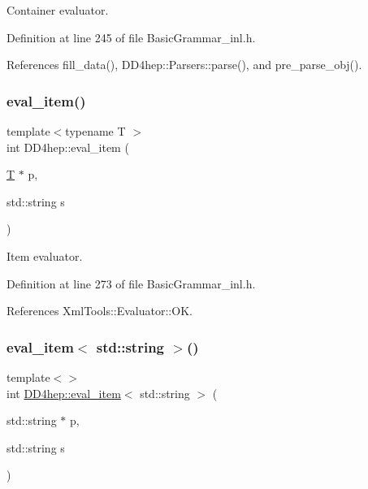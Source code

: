 Container evaluator. 



Definition at line 245 of file Basic\+Grammar\+\_\+inl.\+h.



References fill\+\_\+data(), D\+D4hep\+::\+Parsers\+::parse(), and pre\+\_\+parse\+\_\+obj().

\hypertarget{namespace_d_d4hep_a47a3a238579be60fa5d404b9b714925a}{}\label{namespace_d_d4hep_a47a3a238579be60fa5d404b9b714925a} 
\subsubsection{\texorpdfstring{eval\+\_\+item()}{eval\_item()}}
{\footnotesize\ttfamily template$<$typename T $>$ \\
int D\+D4hep\+::eval\+\_\+item (\begin{DoxyParamCaption}\item[{\hyperlink{class_t}{T} $\ast$}]{p,  }\item[{std\+::string}]{s }\end{DoxyParamCaption})\hspace{0.3cm}{\ttfamily [inline]}}



Item evaluator. 



Definition at line 273 of file Basic\+Grammar\+\_\+inl.\+h.



References Xml\+Tools\+::\+Evaluator\+::\+OK.

\hypertarget{namespace_d_d4hep_ae3ccc02dbc4111905c0523d915b69356}{}\label{namespace_d_d4hep_ae3ccc02dbc4111905c0523d915b69356} 
\subsubsection{\texorpdfstring{eval\+\_\+item$<$ std\+::string $>$()}{eval\_item< std::string >()}}
{\footnotesize\ttfamily template$<$$>$ \\
int \hyperlink{namespace_d_d4hep_a47a3a238579be60fa5d404b9b714925a}{D\+D4hep\+::eval\+\_\+item}$<$ std\+::string $>$ (\begin{DoxyParamCaption}\item[{std\+::string $\ast$}]{p,  }\item[{std\+::string}]{s }\end{DoxyParamCaption})\hspace{0.3cm}{\ttfamily [inline]}}



